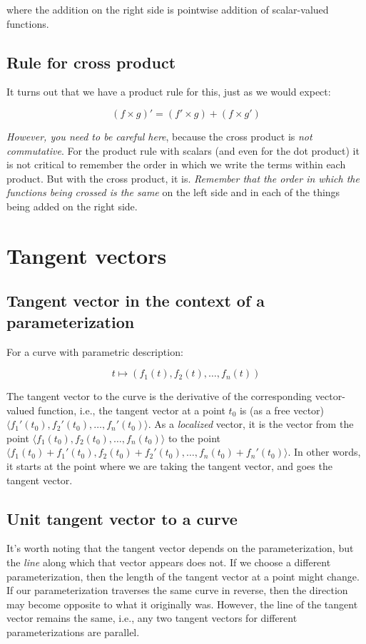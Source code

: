 \documentclass[10pt]{amsart}
\begin{document}
where the addition on the right side is pointwise addition of
scalar-valued functions.

\subsection{Rule for cross product}

It turns out
that we have a product rule for this, just as we would expect:

$$(f \times g)' = (f' \times g) + (f \times g')$$

{\em However, you need to be careful here}, because the cross product
is {\em not commutative}. For the product rule with scalars (and even
for the dot product) it is not critical to remember the order in which
we write the terms within each product. But with the cross product, it
is. {\em Remember that the order in which the functions being crossed
is the same} on the left side and in each of the things being added on
the right side.

\section{Tangent vectors}

\subsection{Tangent vector in the context of a parameterization}

For a curve with parametric description:

$$t \mapsto (f_1(t), f_2(t), \dots, f_n(t))$$

The tangent vector to the curve is the derivative of the corresponding
vector-valued function, i.e., the tangent vector at a point $t_0$ is
(as a free vector) $\langle f_1'(t_0), f_2'(t_0), \dots, f_n'(t_0)
\rangle$. As a {\em localized} vector, it is the vector from the point
$\langle f_1(t_0), f_2(t_0), \dots, f_n(t_0)\rangle$ to the point
$\langle f_1(t_0) + f_1'(t_0), f_2(t_0) + f_2'(t_0), \dots, f_n(t_0) +
f_n'(t_0)\rangle$. In other words, it starts at the point where we are
taking the tangent vector, and goes the tangent vector.

\subsection{Unit tangent vector to a curve}

It's worth noting that the tangent vector depends on the
parameterization, but the {\em line} along which that vector appears
does not. If we choose a different parameterization, then the length
of the tangent vector at a point might change. If our parameterization
traverses the same curve in reverse, then the direction may become
opposite to what it originally was. However, the line of the tangent
vector remains the same, i.e., any two tangent vectors for different
parameterizations are parallel.
\end{document}

